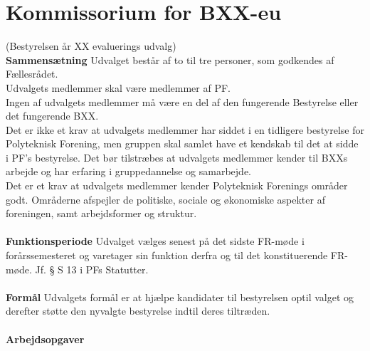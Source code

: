 \section{Kommissorium for BXX-eu}
(Bestyrelsen år XX evaluerings udvalg)\\

\textbf{Sammensætning}
Udvalget består af to til tre personer, som godkendes af Fællesrådet.\\
Udvalgets medlemmer skal være medlemmer af PF.\\
Ingen af udvalgets medlemmer må være en del af den fungerende Bestyrelse eller det fungerende BXX.\\
Det er ikke et krav at udvalgets medlemmer har siddet i en tidligere bestyrelse for Polyteknisk Forening, men gruppen skal samlet have et kendskab til det at sidde i PF’s bestyrelse. Det bør tilstræbes at udvalgets medlemmer kender til BXXs arbejde og har erfaring i gruppedannelse og samarbejde.\\
Det er et krav at udvalgets medlemmer kender Polyteknisk Forenings områder godt. Områderne afspejler de politiske, sociale og økonomiske aspekter af foreningen, samt arbejdsformer og struktur.\\
\\
\textbf{Funktionsperiode}
Udvalget vælges senest på det sidste FR-møde i forårssemesteret og varetager sin funktion derfra og til det konstituerende FR-møde. Jf. § S 13 i PFs Statutter.\\
\\
\textbf{Formål}
Udvalgets formål er at hjælpe kandidater til bestyrelsen optil valget og derefter støtte den nyvalgte bestyrelse indtil
deres tiltræden.
\\
\\
\textbf{Arbejdsopgaver}
